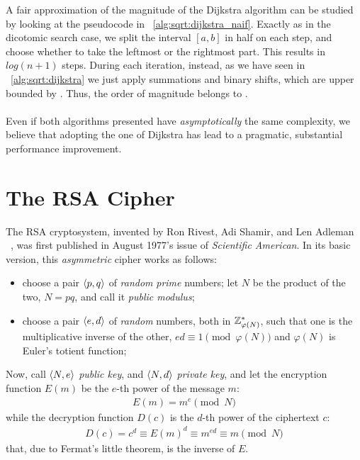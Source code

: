 A fair approximation of the magnitude of the Dijkstra algorithm can be studied
by looking at the pseudocode in ~\ref{alg:sqrt:dijkstra_naif}. Exactly as in
the dicotomic search case, we split the interval $[a, b]$ in half on each step,
and choose whether to take the leftmost or the rightmost part. This results in
$log(n+1)$ steps. During each iteration, instead, as we have seen in
~\ref{alg:sqrt:dijkstra} we just apply summations and binary shifts, which are
upper bounded by . Thus, the order of magnitude belongs to
.

\paragraph{}
Even if both algorithms presented have \emph{asymptotically} the same
complexity, we believe that adopting the one of Dijkstra has lead to a
pragmatic, substantial performance improvement.


\section{The RSA Cipher \label{sec:preq:rsa}}

The RSA cryptosystem, invented by Ron Rivest, Adi Shamir, and Len Adleman
~\cite{rsa}, was first published in August 1977's issue of
\emph{Scientific American}. In its basic version, this \emph{asymmetric} cipher
works as follows:
\begin{itemize}
  \item choose a pair $\langle p, q\rangle$ of \emph{random} \emph{prime} numbers;
    let $N$ be the product of the two, $N=pq$, and call it \emph{public modulus};
  \item choose a pair $\langle e, d\rangle$ of \emph{random} numbers, both in
    $\mathbb{Z}^*_{\varphi(N)}$, such that one is the multiplicative inverse of the
    other, $ed \equiv 1 \pmod{\varphi(N)}$ and $\varphi(N)$ is Euler's totient
    function;
\end{itemize}
Now, call $\langle N, e\rangle$ \emph{public key}, and $\langle N, d\rangle$
\emph{private key}, and let the encryption function $E(m)$ be the $e$-th power of
the message $m$:
\begin{align}
  \label{eq:rsa:encrypt}
  E(m) = m^e \pmod{N}
\end{align}
while the decryption function $D(c)$ is the $d$-th power of the ciphertext $c$:
\begin{align}
  \label{eq:rsa:decrypt}
  D(c) = c^d \equiv E(m)^d \equiv m^{ed} \equiv m \pmod{N}
\end{align}
that, due to Fermat's little theorem, is the inverse of $E$.

